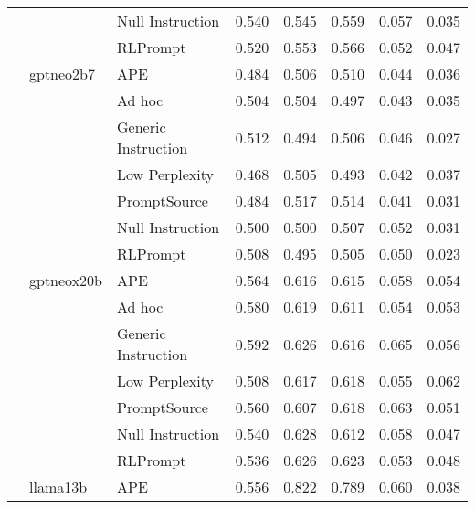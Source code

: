 \begin{supertabular}{lllrrrrr}
              &        & Null Instruction &            0.540 &           0.545 &          0.559 &        0.057 &    0.035 \\
              &        & RLPrompt &            0.520 &           0.553 &          0.566 &        0.052 &    0.047 \\
              & gptneo2b7 & APE &            0.484 &           0.506 &          0.510 &        0.044 &    0.036 \\
              &        & Ad hoc &            0.504 &           0.504 &          0.497 &        0.043 &    0.035 \\
              &        & Generic Instruction &            0.512 &           0.494 &          0.506 &        0.046 &    0.027 \\
              &        & Low Perplexity &            0.468 &           0.505 &          0.493 &        0.042 &    0.037 \\
              &        & PromptSource &            0.484 &           0.517 &          0.514 &        0.041 &    0.031 \\
              &        & Null Instruction &            0.500 &           0.500 &          0.507 &        0.052 &    0.031 \\
              &        & RLPrompt &            0.508 &           0.495 &          0.505 &        0.050 &    0.023 \\
              & gptneox20b & APE &            0.564 &           0.616 &          0.615 &        0.058 &    0.054 \\
              &        & Ad hoc &            0.580 &           0.619 &          0.611 &        0.054 &    0.053 \\
              &        & Generic Instruction &            0.592 &           0.626 &          0.616 &        0.065 &    0.056 \\
              &        & Low Perplexity &            0.508 &           0.617 &          0.618 &        0.055 &    0.062 \\
              &        & PromptSource &            0.560 &           0.607 &          0.618 &        0.063 &    0.051 \\
              &        & Null Instruction &            0.540 &           0.628 &          0.612 &        0.058 &    0.047 \\
              &        & RLPrompt &            0.536 &           0.626 &          0.623 &        0.053 &    0.048 \\
              & llama13b & APE &            0.556 &           0.822 &          0.789 &        0.060 &    0.038 \\

\end{supertabular}
